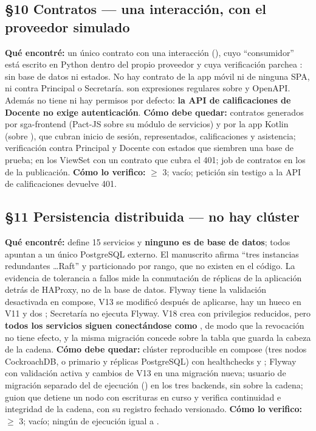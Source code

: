\subsection*{\S10 Contratos --- una interacci\'on, con el proveedor simulado}
\textbf{Qu\'e encontr\'e:} un \'unico contrato con una interacci\'on (), cuyo ``consumidor'' est\'a escrito en Python dentro del propio proveedor y cuya verificaci\'on parchea : sin base de datos ni estados. No hay contrato de la app m\'ovil ni de ninguna SPA, ni contra Principal o Secretar\'ia.  son expresiones regulares sobre  y OpenAPI. Adem\'as  no tiene  ni hay permisos por defecto: \textbf{la API de calificaciones de Docente no exige autenticaci\'on}. \textbf{C\'omo debe quedar:} contratos generados por sga-frontend (Pact-JS sobre su m\'odulo de servicios) y por la app Kotlin (sobre ), que cubran inicio de sesi\'on, representados, calificaciones y asistencia; verificaci\'on contra Principal y Docente con estados que siembren una base de prueba;  en los ViewSet con un contrato que cubra el 401; job de contratos en los  de la publicaci\'on. \textbf{C\'omo lo verifico:}  $\ge$ 3;  vac\'io; petici\'on sin testigo a la API de calificaciones devuelve 401.

\subsection*{\S11 Persistencia distribuida --- no hay cl\'uster}
\textbf{Qu\'e encontr\'e:}  define 15 servicios y \textbf{ninguno es de base de datos}; todos apuntan a un \'unico PostgreSQL externo. El manuscrito afirma ``tres instancias redundantes \ldots Raft'' y particionado por rango, que no existen en el c\'odigo. La evidencia de tolerancia a fallos mide la conmutaci\'on de r\'eplicas de la aplicaci\'on detr\'as de HAProxy, no de la base de datos. Flyway tiene la validaci\'on desactivada en compose, V13 se modific\'o despu\'es de aplicarse, hay un hueco en V11 y dos ; Secretar\'ia no ejecuta Flyway. V18 crea  con privilegios reducidos, pero \textbf{todos los servicios siguen conect\'andose como }, de modo que la revocaci\'on no tiene efecto, y la misma migraci\'on concede  sobre la tabla que guarda la cabeza de la cadena. \textbf{C\'omo debe quedar:} cl\'uster reproducible en compose (tres nodos CockroachDB, o primario y r\'eplicas PostgreSQL) con healthchecks y ; Flyway con validaci\'on activa y cambios de V13 en una migraci\'on nueva; usuario de migraci\'on separado del de ejecuci\'on () en los tres backends, sin  sobre la cadena; guion que detiene un nodo con escrituras en curso y verifica continuidad e integridad de la cadena, con su registro fechado versionado. \textbf{C\'omo lo verifico:}  $\ge$ 3;  vac\'io; ning\'un  de ejecuci\'on igual a .

